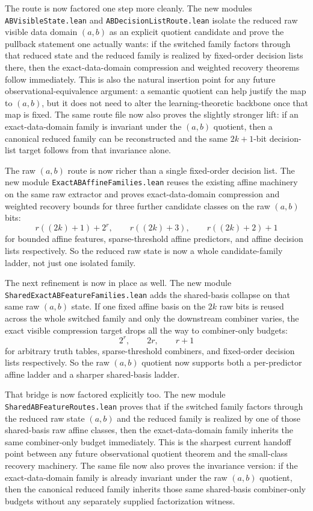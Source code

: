 \documentclass[11pt]{article}
\theoremstyle{remark}
\begin{document}
The route is now factored one step more cleanly.  The new modules
\texttt{ABVisibleState.lean} and \texttt{ABDecisionListRoute.lean} isolate the
reduced raw visible data domain \((a,b)\) as an explicit quotient candidate and
prove the pullback statement one actually wants: if the switched family factors
through that reduced state and the reduced family is realized by fixed-order
decision lists there, then the exact-data-domain compression and weighted recovery
theorems follow immediately.  This is also the natural insertion point for any
future observational-equivalence argument: a semantic quotient can help justify
the map to \((a,b)\), but it does not need to alter the learning-theoretic
backbone once that map is fixed.  The same route file now also proves the
slightly stronger lift: if an exact-data-domain family is invariant under the
\((a,b)\) quotient, then a canonical reduced family can be reconstructed and
the same \(2k+1\)-bit decision-list target follows from that invariance alone.

The raw \((a,b)\) route is now richer than a single fixed-order decision list.
The new module \texttt{ExactABAffineFamilies.lean} reuses the existing affine
machinery on the same raw extractor and proves exact-data-domain compression and
weighted recovery bounds for three further candidate classes on the raw
\((a,b)\) bits:
\[
  r((2k)+1)+2^r, \qquad r((2k)+3), \qquad r((2k)+2)+1
\]
for bounded affine features, sparse-threshold affine predictors, and affine
decision lists respectively.  So the reduced raw state is now a whole
candidate-family ladder, not just one isolated family.

The next refinement is now in place as well.  The new module
\texttt{SharedExactABFeatureFamilies.lean} adds the shared-basis collapse on
that same raw \((a,b)\) state.  If one fixed affine basis on the \(2k\) raw
bits is reused across the whole switched family and only the downstream
combiner varies, the exact visible compression target drops all the way to
combiner-only budgets:
\[
  2^r, \qquad 2r, \qquad r+1
\]
for arbitrary truth tables, sparse-threshold combiners, and fixed-order
decision lists respectively.  So the raw \((a,b)\) quotient now supports both a
per-predictor affine ladder and a sharper shared-basis ladder.

That bridge is now factored explicitly too.  The new module
\texttt{SharedABFeatureRoutes.lean} proves that if the switched family factors
through the reduced raw state \((a,b)\) and the reduced family is realized by
one of those shared-basis raw affine classes, then the exact-data-domain family
inherits the same combiner-only budget immediately.  This is the sharpest
current handoff point between any future observational quotient theorem and the
small-class recovery machinery.  The same file now also proves the invariance
version: if the exact-data-domain family is already invariant under the raw
\((a,b)\) quotient, then the canonical reduced family inherits those same
shared-basis combiner-only budgets without any separately supplied
factorization witness.
\end{document}
